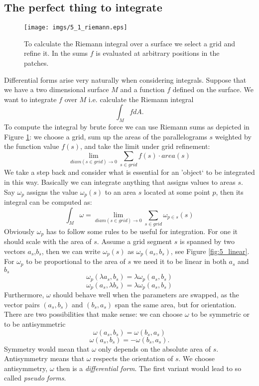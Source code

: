 \subsection{The perfect thing to integrate}
\label{sec:dfmotivation}
\begin{figure}
	\begin{center}
	\texttt{[image: imgs/5\_1\_riemann.eps]}
	\end{center}
	\vspace{-1cm}
	\caption{To calculate the Riemann integral over a surface we select a grid and refine it. In the sums $f$ is evaluated at arbitrary positions in the patches.}
	\label{fig:5_1_riemsum}
\end{figure}

Differential forms arise very naturally when considering integrals. Suppose that we have a two dimensional surface $M$ and a function $f$ defined on the surface. We want to integrate $f$ over $M$ i.e. calculate the Riemann integral
\[\int_{M} f dA.\]
To compute the integral by brute force we can use Riemann sums as depicted in Figure \ref{fig:5_1_riemsum}: we choose a grid, sum up the areas of the parallelograms $s$ weighted by the  function value $f(s)$, and take the limit under grid refinement:
\[\lim_{diam(s\in grid)\rightarrow 0} \sum_{s \in grid} f(s)\cdot area(s) \]
We take a step back and consider what is essential for an 'object` to be integrated in this way.
Basically we can integrate anything that assigns values to areas $s$. Say $\omega_p$ assigns the value $\omega_p(s)$ to an area $s$ located at some point $p$, then its integral can be computed as:
\[\int_M \omega = \lim_{diam(s\in grid)\rightarrow 0} \sum_{s \in grid} \omega_{p\in s}(s)\]
Obviously $\omega_p$ has to follow some rules to be useful for integration. For one it should scale with the area of $s$. Assume a grid segment $s$ is spanned by two vectors $a_s$,$b_s$, then we can write $\omega_p(s)$ as $\omega_p(a_s,b_s)$, see Figure \ref{fig:5_linear}. For $\omega_p$ to be proportional to the area of $s$ we need it to be linear in both $a_s$ and $b_s$
\[\omega_p(\lambda a_s, b_s) =\lambda \omega_p(a_s,b_s)\]
\[\omega_p(a_s , \lambda b_s) =\lambda \omega_p(a_s,b_s)\]
Furthermore, $\omega$ should behave well when the parameters are swapped, as the vector pairs $(a_s,b_s)$ and $(b_s,a_s)$ span the same area, but for orientation. There are two possibilities that make sense: we can choose $\omega$ to be symmetric or to be antisymmetric
\[\omega(a_s,b_s) = \omega(b_s,a_s)\]
\[\omega(a_s,b_s) = - \omega(b_s,a_s).\]
Symmetry would mean that $\omega$ only depends on the absolute area of $s$. Antisymmetry means that $\omega$ respects the orientation of $s$. We choose antisymmetry, $\omega$ then is a \emph{differential form}. The first variant would lead to so called \emph{pseudo forms}. 

